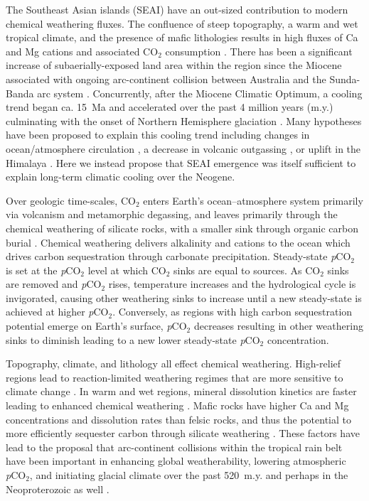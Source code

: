 \documentclass[11pt,letterpaper]{article}
\newcommand{\pCOtwo}{\textit{p}CO$_{2}$\xspace}
\newcommand{\COtwo}{CO$_{2}$\xspace}
\begin{document}
The Southeast Asian islands (SEAI) have an out-sized contribution to modern chemical weathering fluxes. The confluence of steep topography, a warm and wet tropical climate, and the presence of mafic lithologies results in high fluxes of Ca and Mg cations and associated \COtwo consumption \cite{Gaillardet1999a}. There has been a significant increase of subaerially-exposed land area within the region since the Miocene associated with ongoing arc-continent collision between Australia and the Sunda-Banda arc system \cite{Molnar2015a, Macdonald2019a}. Concurrently, after the Miocene Climatic Optimum, a cooling trend began ca. 15~Ma and accelerated over the past 4 million years (m.y.) culminating with the onset of Northern Hemisphere glaciation \cite{Zachos2008a}. Many hypotheses have been proposed to explain this cooling trend including changes in ocean/atmosphere circulation \cite{Haug1998a, Shevenell2004a, Molnar2015a}, a decrease in volcanic outgassing \cite{Berner1983a}, or uplift in the Himalaya \cite{Raymo1992a, Galy2007a}. Here we instead propose that SEAI emergence was itself sufficient to explain long-term climatic cooling over the Neogene.

Over geologic time-scales, \COtwo enters Earth's ocean--atmosphere system primarily via volcanism and metamorphic degassing, and leaves primarily through the chemical weathering of silicate rocks, with a smaller sink through organic carbon burial \cite{Kump1997a}. Chemical weathering delivers alkalinity and cations to the ocean which drives carbon sequestration through carbonate precipitation. Steady-state \pCOtwo is set at the \pCOtwo level at which \COtwo sinks are equal to sources. As \COtwo sinks are removed and \pCOtwo rises, temperature increases and the hydrological cycle is invigorated, causing other weathering sinks to increase until a new steady-state is achieved at higher \pCOtwo \cite{Kump1997a}. Conversely, as regions with high carbon sequestration potential emerge on Earth's surface, \pCOtwo decreases resulting in other weathering sinks to diminish leading to a new lower steady-state \pCOtwo concentration.

Topography, climate, and lithology all effect chemical weathering. High-relief regions lead to reaction-limited weathering regimes that are more sensitive to climate change \cite{Gabet2009a, West2012a}. In warm and wet regions, mineral dissolution kinetics are faster leading to enhanced chemical weathering \cite{West2012a}. Mafic rocks have higher Ca and Mg concentrations and dissolution rates than felsic rocks, and thus the potential to more efficiently sequester carbon through silicate weathering \cite{Dessert2003a}. These factors have lead to the proposal that arc-continent collisions within the tropical rain belt have been important in enhancing global weatherability, lowering atmospheric \pCOtwo, and initiating glacial climate over the past 520~m.y. \cite{Jagoutz2016a, Swanson-Hysell2017a, Macdonald2019a} and perhaps in the Neoproterozoic as well \cite{Park2019b}.
\end{document}
